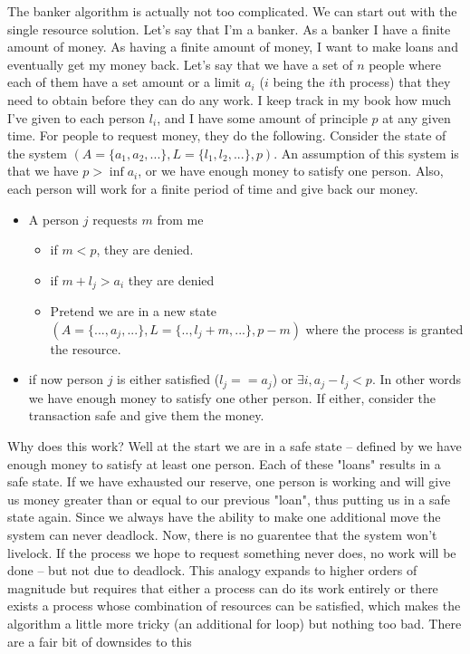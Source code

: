 \begin{aside}
The banker algorithm is actually not too complicated. We can start out with the single resource solution. Let's say that I'm a banker. As a banker I have a finite amount of money. As having a finite amount of money, I want to make loans and eventually get my money back. Let's say that we have a set of $n$ people where each of them have a set amount or a limit $a_i$ ($i$ being the $i$th process) that they need to obtain before they can do any work. I keep track in my book how much I've given to each person $l_i$, and I have some amount of principle $p$ at any given time. For people to request money, they do the following. Consider the state of the system $(A=\{a_1, a_2, ...\}, L=\{l_1, l_2, ...\}, p)$. An assumption of this system is that we have $p > \inf a_i$, or we have enough money to satisfy one person. Also, each person will work for a finite period of time and give back our money.

\begin{itemize}
\item A person $j$ requests $m$ from me
\begin{itemize}
\item if $m < p$, they are denied.
\item if $m + l_j > a_i$ they are denied
\item Pretend we are in a new state $(A=\{..., a_j, ...\}, L=\{.., l_j + m, ...\}, p - m)$ where the process is granted the resource.
\end{itemize}
\item if now person $j$ is either satisfied ($l_j == a_j$) or $\exists i, a_j - l_j < p$. In other words we have enough money to satisfy one other person. If either, consider the transaction safe and give them the money.
\end{itemize}

Why does this work? Well at the start we are in a safe state -- defined by we have enough money to satisfy at least one person. Each of these "loans" results in a safe state. If we have exhausted our reserve, one person is working and will give us money greater than or equal to our previous "loan", thus putting us in a safe state again. Since we always have the ability to make one additional move the system can never deadlock. Now, there is no guarentee that the system won't livelock. If the process we hope to request something never does, no work will be done -- but not due to deadlock. This analogy expands to higher orders of magnitude but requires that either a process can do its work entirely or there exists a process whose combination of resources can be satisfied, which makes the algorithm a little more tricky (an additional for loop) but nothing too bad. There are a fair bit of downsides to this


\end{aside}

